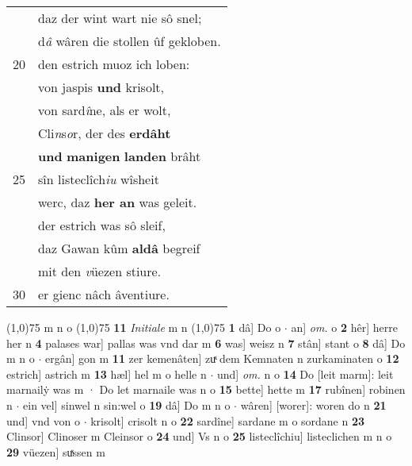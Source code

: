 \documentclass[8pt,a4paper,notitlepage]{article}
\begin{document}
\begin{table}[ht]
\begin{minipage}[t]{0.5\linewidth}
\begin{tabular}{rl}
 & daz der wint wart nie sô snel;\\ 
 & d\textit{â} wâren die stollen ûf gekloben.\\ 
20 & den estrich muoz ich loben:\\ 
 & von jaspis \textbf{und} krisolt,\\ 
 & von sard\textit{î}ne, als er wolt,\\ 
 & Cli\textit{n}s\textit{o}r, der des \textbf{erdâht}\\ 
 & \textbf{und} \textbf{manigen} \textbf{landen} brâht\\ 
25 & sîn listeclîch\textit{iu} wîsheit\\ 
 & werc, daz \textbf{her an} was geleit.\\ 
 & der estrich was sô sleif,\\ 
 & daz Gawan kûm \textbf{aldâ} begreif\\ 
 & mit den \textit{v}üezen stiure.\\ 
30 & er gienc nâch âventiure.\\ 
\end{tabular}
\scriptsize
\line(1,0){75} \newline
m n o \newline
\line(1,0){75} \newline
\textbf{11} \textit{Initiale} m n  \newline
\line(1,0){75} \newline
\textbf{1} dâ] Do o  $\cdot$ an] \textit{om.} o \textbf{2} hêr] herre her n \textbf{4} palases war] pallas was vnd dar m \textbf{6} was] weisz n \textbf{7} stân] stant o \textbf{8} dâ] Do m n o  $\cdot$ ergân] gon m \textbf{11} zer kemenâten] zuͯ dem Kemnaten n zurkaminaten o \textbf{12} estrich] astrich m \textbf{13} hæl] hel m o helle n  $\cdot$ und] \textit{om.} n o \textbf{14} Do [leit marm]: leit marnailẏ was m · Do let marnaile was n o \textbf{15} bette] hette m \textbf{17} rubînen] robinen n  $\cdot$ ein vel] sinwel n sin:wel o \textbf{19} dâ] Do m n o  $\cdot$ wâren] [worer]: woren do n \textbf{21} und] vnd von o  $\cdot$ krisolt] crisolt n o \textbf{22} sardîne] sardane m o sordane n \textbf{23} Clinsor] Clinoser m Cleinsor o \textbf{24} und] Vs n o \textbf{25} listeclîchiu] listeclichen m n o \textbf{29} vüezen] suͯssen m \newline
\end{minipage}
\end{table}
\newpage
\end{document}
